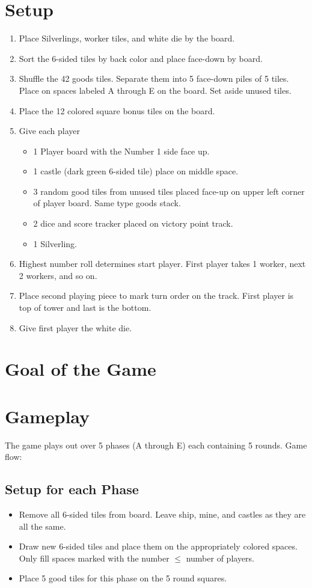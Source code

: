 \documentclass[12pt]{article}
\newenvironment{enumerateCustom}
{\begin{enumerate}
  \setlength{\itemsep}{1pt}
  \setlength{\parskip}{0pt}
  \setlength{\parsep}{0pt}}
{\end{enumerate}}
\newenvironment{itemizeCustom}
{\begin{itemize}
  \setlength{\itemsep}{1pt}
  \setlength{\parskip}{0pt}
  \setlength{\parsep}{0pt}}
{\end{itemize}}
\begin{document}
\begin{multicols*}{2}

\section*{Setup}
\begin{enumerateCustom}
	\item Place Silverlings, worker tiles, and white die by the board.
	\item Sort the 6-sided tiles by back color and place face-down by board.
	\item Shuffle the 42 goods tiles. Separate them into 5 face-down piles of 5 tiles. Place on spaces labeled A through E on the board. Set aside unused tiles.
	\item Place the 12 colored square bonus tiles on the board.
	\item Give each player
		\begin{itemizeCustom}
			\item 1 Player board with the Number 1 side face up.
			\item 1 castle (dark green 6-sided tile) place on middle space.
			\item 3 random good tiles from unused tiles placed face-up on upper left corner of player board. Same type goods stack.
			\item 2 dice and score tracker placed on victory point track.
			\item 1 Silverling.
		\end{itemizeCustom}
	\item Highest number roll determines start player. First player takes 1 worker, next 2 workers, and so on. 
	\item Place second playing piece to mark turn order on the track. First player is top of tower and last is the bottom.
	\item Give first player the white die.
\end{enumerateCustom}
\section*{Goal of the Game}
\section*{Gameplay}
The game plays out over 5 phases (A through E) each containing 5 rounds. Game flow:

\subsection*{Setup for each Phase}
\begin{itemizeCustom}
	\item Remove all 6-sided tiles from board. Leave ship, mine, and castles as they are all the same.
	\item Draw new 6-sided tiles and place them on the appropriately colored spaces. Only fill spaces marked with the number $\le$ number of players.
	\item Place 5 good tiles for this phase on the 5 round squares.
\end{itemizeCustom}


\end{multicols*}
\end{document}
